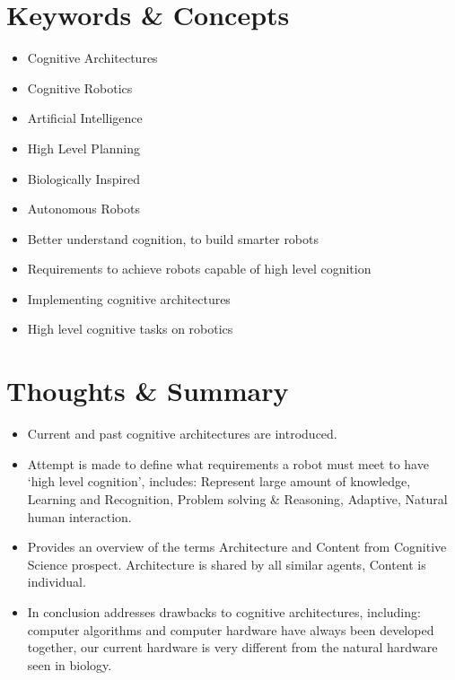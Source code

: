 \documentclass[twoside]{article}
\begin{document}
\begin{multicols}{2} %

\section{Keywords \& Concepts}
\begin{itemize}[noitemsep]
\item Cognitive Architectures
\item Cognitive Robotics
\item Artificial Intelligence
\item High Level Planning
\item Biologically Inspired
\item Autonomous Robots
%
%
\item Better understand cognition, to build smarter robots
\item Requirements to achieve robots capable of high level cognition
\item Implementing cognitive architectures
\item High level cognitive tasks on robotics
\end{itemize}



\section{Thoughts \& Summary}
\begin{itemize}[noitemsep]
\item Current and past cognitive architectures are introduced. 
\item Attempt is made to define what requirements a robot must meet to have `high level cognition', includes: Represent large amount of knowledge, Learning and Recognition, Problem solving \& Reasoning, Adaptive, Natural human interaction.
\item Provides an overview of the terms Architecture and Content from Cognitive Science prospect. Architecture is shared by all similar agents, Content is individual.
\item In conclusion addresses drawbacks to cognitive architectures, including: computer algorithms and computer hardware have always been developed together, our current hardware is very different from the natural hardware seen in biology.
\end{itemize}



\end{multicols}
\end{document}
